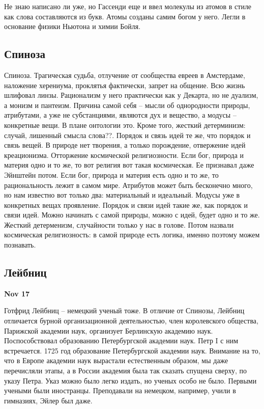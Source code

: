 \documentclass[a4paper, 12pt]{article}
\begin{document}
Не знаю написано ли уже, но Гассенди еще и ввел молекулы из атомов 
в стиле как слова составляются из букв. Атомы созданы самим богом 
у него. Легли в основание физики Ньютона и химии Бойля.


\subsection{Спиноза}

Спиноза. Трагическая судьба, отлучение от сообщества евреев 
в Амстердаме, наложение херениума, проклятья фактически, запрет на 
общение. Всю жизнь шлифовал линзы. Рационализм у него практически как 
у Декарта, но не дуализм, а монизм и пантеизм. Причина самой себя -- 
мысли об однородности природы, атрибутами, а уже не субстанциями, 
являются дух и вещество, а модусы -- конкретные вещи. В плане онтологии 
это. Кроме того, жесткий детерминизм: случай, лишенный смысла слова??. 
Порядок и связь идей те же, что порядок и связь вещей. В природе нет 
творения, а только порождение, отвержение идей креационизма. Отторжение 
космической религиозности. Если бог, природа и материя одно и то же, то 
вот религия вот такая космическая. Ее признавал даже Эйнштейн потом. 
Если бог, природа и материя есть одно и то же, то рациональность лежит 
в самом мире. Атрибутов может быть бесконечно много, но нам известно вот 
только два: материальный и идеальный. Модусы уже в конкретных вещах 
проявление. Порядок и связи идей такие же, как порядок и связи идей. 
Можно начинать с самой природы, можно с идей, будет одно и то же. 
Жесткий детерменизм, случайности только у нас в голове. Потом назвали 
космическая религиозность: в самой природе есть логика, именно поэтому 
можем познавать.


\subsection{Лейбниц}

\hfill \textbf{Nov 17}

Готфрид Лейбниц -- немецкий ученый тоже. В отличие от Спинозы, Лейбниц 
отличается бурной организационной деятельностью, член королевского 
общества, Парижской академии наук, организует Берлинскую академию наук. 
Поспособствовал образованию Петербургской академии наук. Петр I с ним 
встречается. 1725 год образование Петербургской академии наук. Внимание 
на то, что в Европе академии наук вырастали естественным образом, мы 
даже перечисляли этапы, а в России академия была так сказать спущена 
сверху, по указу Петра. Указ можно было легко издать, но ученых особо не 
было. Первыми учеными были иностранцы. Преподавали на немецком, 
например, учили в гимназиях, Эйлер был даже.
\end{document}
